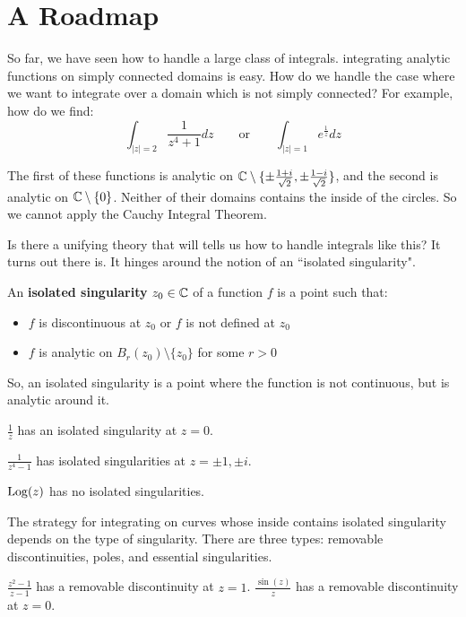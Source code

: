 \section{A Roadmap}

So far, we have seen how to handle a large class of integrals. integrating analytic functions on simply connected domains is easy. How do we handle the case where we want to integrate over a domain which is not simply connected? For example, how do we find:
$$\int_{|z| = 2} \frac{1}{z^4 + 1}dz \qquad \text{or} \qquad \int_{|z| = 1}e^{\frac{1}{z}}dz$$

The first of these functions is analytic on $\mathbb{C}\setminus\{\pm\frac{1+i}{\sqrt{2}},\pm \frac{1-i}{\sqrt{2}}\}$, and the second is analytic on $\mathbb{C}\setminus\{0\}$. Neither of their domains contains the inside of the circles. So we cannot apply the Cauchy Integral Theorem.

Is there a unifying theory that will tells us how to handle integrals like this? It turns out there is. It hinges around the notion of an ``isolated singularity".

\begin{defbo}{}{}An {\bf isolated singularity} $z_0\in\mathbb{C}$ of a function $f$ is a point such that:

\begin{itemize} 
	\item $f$ is discontinuous at $z_0$ or $f$ is not defined at $z_0$
	\item $f$ is analytic on $B_r(z_0)\setminus\{z_0\}$ for some $r > 0$
\end{itemize}
\end{defbo}

So, an isolated singularity is a point where the function is not continuous, but is analytic around it.

\begin{ex}{}{} $\frac{1}{z}$ has an isolated singularity at $z = 0$.

$\frac{1}{z^4 - 1}$ has isolated singularities at $z= \pm 1,\pm i$.

$\mathrm{Log}(z)$ has no isolated singularities.
\end{ex}

The strategy for integrating on curves whose inside contains isolated singularity depends on the type of singularity. There are three types: removable discontinuities, poles, and essential singularities.

\begin{ex}{}{} $\frac{z^2 -1}{z - 1}$ has a removable discontinuity at $z = 1$. $\frac{\sin(z)}{z}$ has a removable discontinuity at $z = 0$.\end{ex}

